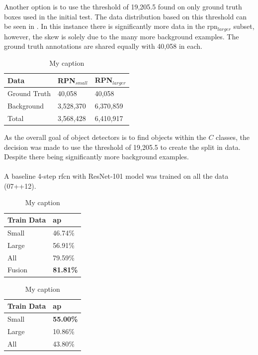 Another option is to use the threshold of 19,205.5 found on only ground truth boxes used in the initial test. The data distribution based on this threshold can be seen in . In this instance there is significantly more data in the \gls{rpn}$_{larger}$ subset, however, the skew is solely due to the many more background examples. The ground truth annotations are shared equally with 40,058 in each.

\begin{table}[h]
\centering
\caption{My caption}
\label{tab:splitgt}
\begin{tabular}{|l|l|l|}
\hline
\textbf{Data} & \textbf{RPN$_{small}$} & \textbf{RPN$_{larger}$} \\ \hline
Ground Truth & 40,058    & 40,058     \\ 
Background   & 3,528,370 & 6,370,859  \\ \hline
Total        & 3,568,428 & 6,410,917  \\ \hline
\end{tabular}
\end{table}

As the overall goal of object detectors is to find objects within the $C$ classes, the decision was made to use the threshold of 19,205.5 to create the split in data. Despite there being significantly more background examples. 
\\\\
A baseline 4-step \gls{rfcn} with ResNet-101 model was trained on all the data (07++12).

\begin{table}[h]
\centering
\caption{My caption}
\label{my-label}
\begin{tabular}{|l|l|}
\hline
\textbf{Train Data} & \textbf{\gls{ap}}      \\ \hline
Small      & 46.74\% \\ \hline
Large      & 56.91\% \\ \hline
All        & 79.59\% \\ \hline
Fusion     & \textbf{81.81\%} \\ \hline
\end{tabular}
\end{table}


\begin{table}[h]
\centering
\caption{My caption}
\label{my-label}
\begin{tabular}{|l|l|}
\hline
\textbf{Train Data} & \textbf{\gls{ap}}      \\ \hline
Small      & \textbf{55.00\%} \\ \hline
Large      & 10.86\% \\ \hline
All        & 43.80\% \\ \hline
\end{tabular}
\end{table}


